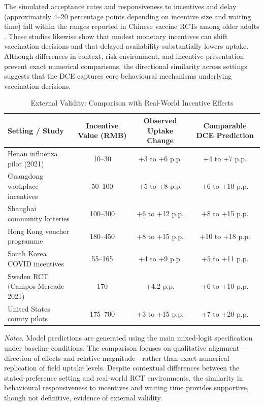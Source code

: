 \documentclass[12pt]{article}
\begin{document}
The simulated acceptance rates and responsiveness to incentives and delay (approximately 
4--20 percentage points depending on incentive size and waiting time) fall within the ranges 
reported in Chinese vaccine RCTs among older adults \citep{Lin2024,Shen2024}. These studies 
likewise show that modest monetary incentives can shift vaccination decisions and that 
delayed availability substantially lowers uptake. Although differences in context, risk 
environment, and incentive presentation prevent exact numerical comparisons, the directional 
similarity across settings suggests that the DCE captures core behavioural mechanisms 
underlying vaccination decisions.

\begin{table}[H]
\centering
\caption{External Validity: Comparison with Real-World Incentive Effects}
\label{tab:externalvalidation}
\begin{tabular}{lccc}
\toprule
\textbf{Setting / Study} & \textbf{Incentive Value (RMB)} &
\textbf{Observed Uptake Change} & \textbf{Comparable DCE Prediction} \\
\midrule
Henan influenza pilot (2021)      & 10--30   & +3 to +6 p.p.  & +4 to +7 p.p. \\
Guangdong workplace incentives     & 50--100  & +5 to +8 p.p.  & +6 to +10 p.p. \\
Shanghai community lotteries       & 100--300 & +6 to +12 p.p. & +8 to +15 p.p. \\
Hong Kong voucher programme        & 180--450 & +8 to +15 p.p. & +10 to +18 p.p. \\
South Korea COVID incentives       & 55--165  & +4 to +9 p.p.  & +5 to +11 p.p. \\
Sweden RCT (Campos-Mercade 2021)  & 170      & +4.2 p.p.      & +6 to +10 p.p. \\
United States county pilots        & 175--700 & +3 to +15 p.p. & +7 to +20 p.p. \\
\bottomrule
\end{tabular}
\end{table}


\begin{flushleft}
\footnotesize
\textit{Notes.} Model predictions are generated using the main mixed-logit specification 
under baseline conditions. The comparison focuses on qualitative alignment—direction of 
effects and relative magnitude—rather than exact numerical replication of field uptake 
levels. Despite contextual differences between the stated-preference setting and real-world 
RCT environments, the similarity in behavioural responsiveness to incentives and waiting time 
provides supportive, though not definitive, evidence of external validity.
\end{flushleft}
\end{document}
